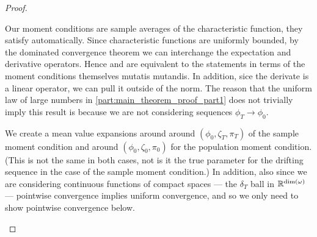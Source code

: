 \documentclass[11pt, letterpaper, twoside, final]{article}
\begin{document}
\begin{appendices}
\begin{proof}
\begin{proofpart}
    Our moment conditions are sample averages of the characteristic function, they satisfy 
    automatically. 
    Since characteristic functions are uniformly bounded, by the dominated convergence theorem we can interchange the 
    expectation and derivative operators. 
    Hence  and  are equivalent to the statements in terms of the moment
    conditions themselves mutatis mutandis.  
    In addition, sice the derivate is a linear operator, we can pull it outside of the norm.
    The reason that the uniform law of large numbers in \cref{part:main_theorem_proof_part1} does not trivially
    imply this result is because we are not considering sequences $\phi_T \to \phi_0$. 


    We create a mean value expansions around around $(\phi_0, \zeta_T, \pi_T)$ of the sample moment condition and
    around $(\phi_0, \zeta_0, \pi_0)$ for the population moment condition.
    (This is not the same in both cases, not is it the true parameter for the drifting sequence in the case of the
    sample moment condition.)
    In addition, also since we are considering continuous functions of compact spaces --- the $\delta_T$ ball in
    $\mathbb{R}^{\dim(\omega)}$ --- pointwise convergence implies uniform convergence, and so we only need to show pointwise
    convergence below.


\end{proofpart}
\end{proof}
\end{appendices}
\end{document}
